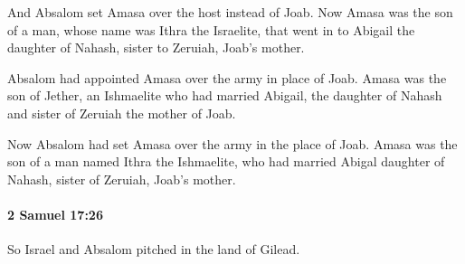 			\begin{versebox}
					\item[BHS] 
					\item[ASV] And Absalom set Amasa over the host instead of Joab. Now Amasa was the son of a man, whose name was Ithra the Israelite, that went in to Abigail the daughter of Nahash, sister to Zeruiah, Joab's mother.
					\item[NIV] Absalom had appointed Amasa over the army in place of Joab. Amasa was the son of Jether, an Ishmaelite who had married Abigail, the daughter of Nahash and sister of Zeruiah the mother of Joab.
					\item[NRSV] Now Absalom had set Amasa over the army in the place of Joab. Amasa was the son of a man named Ithra the Ishmaelite, who had married Abigal daughter of Nahash, sister of Zeruiah, Joab’s mother.
			\end{versebox}

		\paragraph{2 Samuel 17:26} %
			\label{2SAMUEL-17-26}

			So Israel and Absalom pitched in the land of Gilead.

